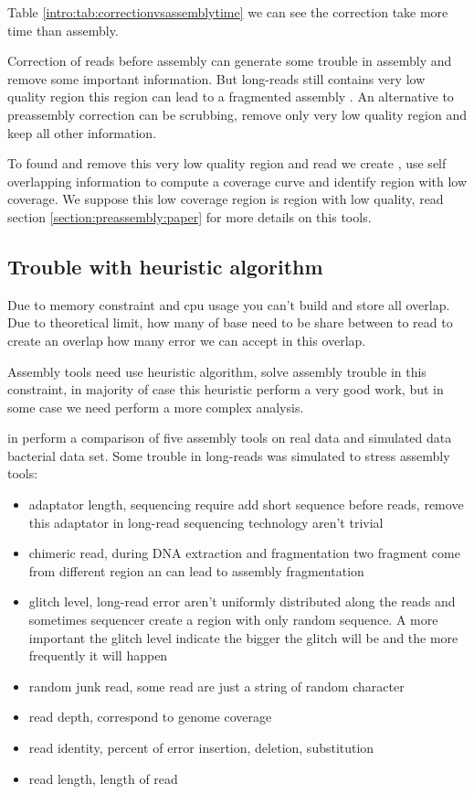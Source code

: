 \documentclass[./main.tex]{subfiles}
\begin{document}
Table \ref{intro:tab:correctionvsassemblytime} we can see the correction take more time than assembly.

Correction of reads before assembly can generate some trouble in assembly and remove some important information. But long-reads still contains very low quality region \cite{blog_post_error_repartition} this region can lead to a fragmented assembly \cite{long_read_assembler_comparison}. An alternative to preassembly correction can be scrubbing, remove only very low quality region and keep all other information.

To found and remove this very low quality region and read we create \yacrd, \yacrd use self overlapping information to compute a coverage curve and identify region with low coverage. We suppose this low coverage region is region with low quality, read section \ref{section:preassembly:paper} for more details on this tools.

\subsection{Trouble with heuristic algorithm}

Due to memory constraint and cpu usage you can't build and store all overlap.
Due to theoretical limit, how many of base need to be share between to read to create an overlap how many error we can accept in this overlap.

Assembly tools need use heuristic algorithm, solve assembly trouble in this constraint, in majority of case this heuristic perform a very good work, but in some case we need perform a more complex analysis.

\citeauthor{long_read_assembler_comparison} in \cite{long_read_assembler_comparison} perform a comparison of five assembly tools on real data and simulated data bacterial data set. Some trouble in long-reads was simulated to stress assembly tools:
\begin{itemize}
    \item adaptator length, sequencing require add short sequence before reads, remove this adaptator in long-read sequencing technology aren't trivial
    \item chimeric read, during DNA extraction and fragmentation two fragment come from different region an can lead to assembly fragmentation
    \item glitch level, long-read error aren't uniformly distributed along the reads and sometimes sequencer create a region with only random sequence. A more important the glitch level indicate the bigger the glitch will be and the more frequently it will happen
    \item random junk read, some read are just a string of random character
    \item read depth, correspond to genome coverage
    \item read identity, percent of error insertion, deletion, substitution 
    \item read length, length of read 
\end{itemize}
\end{document}
